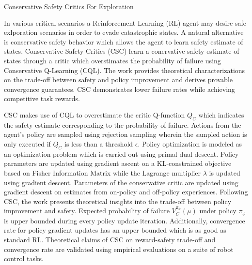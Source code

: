 \documentclass[11pt,letterpaper]{article}
\begin{document}
\begin{center}
  \large{Conservative Safety Critics For Exploration}
\end{center}

In various critical scenarios a Reinforcement Learning (RL) agent may desire safe exlporation scenarios in order to evade catastrophic states. A natural alternative is conservative safety behavior which allows the agent to learn safety estimate of states. Conservative Safety Critics (CSC) learn a conervative safety estimate of states through a critic which overstimates the probability of failure using Conservative Q-Learning (CQL). The work provides theoretical characterizations on the trade-off between safety and policy improvement and derives provable convergence guarantees. CSC demonstrates lower failure rates while achieving competitive task rewards. 

CSC makes use of CQL to overestimate the critic Q-function $Q_{C}$ which indicates the safety estimate corresponding to the probability of failure. Actions from the agent's policy are sampled using rejection sampling wherein the sampled action is only executed if $Q_{C}$ is less than a threshold $\epsilon$. Policy optimization is modeled as an optimization problem which is carried out using primal dual descent. Policy parameters are updated using gradient ascent on a KL-constrained objective based on Fisher Information Matrix while the Lagrange multiplier $\lambda$ is updated using gradient descent. Parameters of the conservative critic are updated using gradient descent on estimates from on-policy and off-policy experiences. Following CSC, the work presents theoretical insights into the trade-off between policy improvement and safety. Expected probability of failure $V_{C}^{\pi_{\phi}}(\mu)$ under policy $\pi_{\phi}$ is upper bounded during every policy update iteration. Additionally, convergence rate for policy gradient updates has an upper bounded which is as good as standard RL. Theoretical claims of CSC on reward-safety trade-off and convergence rate are validated using empirical evaluations on a suite of robot control tasks. 
\end{document}
